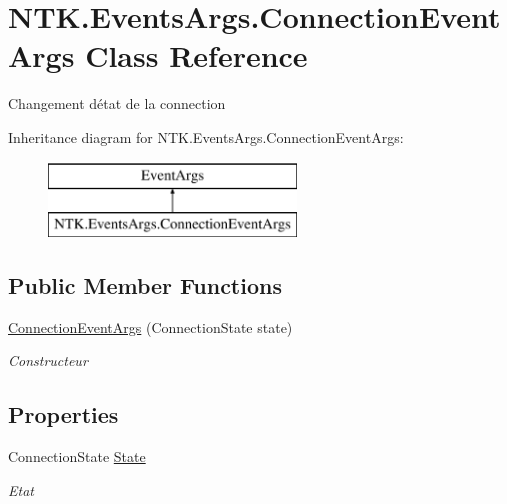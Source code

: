 \hypertarget{class_n_t_k_1_1_events_args_1_1_connection_event_args}{}\section{N\+T\+K.\+Events\+Args.\+Connection\+Event\+Args Class Reference}
\label{class_n_t_k_1_1_events_args_1_1_connection_event_args}


Changement d\textquotesingle{}état de la connection  


Inheritance diagram for N\+T\+K.\+Events\+Args.\+Connection\+Event\+Args\+:\begin{figure}[H]
\begin{center}
\leavevmode
\includegraphics[height=2.000000cm]{d4/d12/class_n_t_k_1_1_events_args_1_1_connection_event_args}
\end{center}
\end{figure}
\subsection*{Public Member Functions}
\begin{DoxyCompactItemize}
\item 
\mbox{\hyperlink{class_n_t_k_1_1_events_args_1_1_connection_event_args_a1faf874b62f28a87396d93de0513f781}{Connection\+Event\+Args}} (Connection\+State state)
\begin{DoxyCompactList}\small\item\em Constructeur \end{DoxyCompactList}\end{DoxyCompactItemize}
\subsection*{Properties}
\begin{DoxyCompactItemize}
\item 
Connection\+State \mbox{\hyperlink{class_n_t_k_1_1_events_args_1_1_connection_event_args_a42e1cb564b6a60eac617698195bf6ea0}{State}}
\begin{DoxyCompactList}\small\item\em Etat \end{DoxyCompactList}\end{DoxyCompactItemize}


